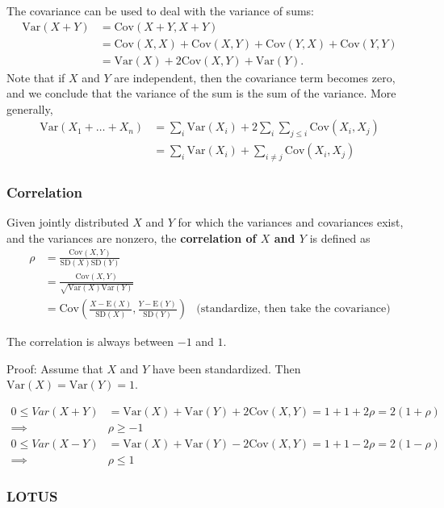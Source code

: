 \documentclass[a4paper,10pt]{article}
\newcommand{\E}{\mathrm{E}}
\newcommand{\Var}{\mathrm{Var}}
\newcommand{\Cov}{\mathrm{Cov}}
\newcommand{\SD}{\mathrm{SD}}
\begin{document}
The covariance can be used to deal with the variance of sums: 
\begin{align*}
    \Var(X+Y) &= \Cov(X+Y, X+Y) \\
    &= \Cov(X, X) + \Cov(X, Y) + \Cov(Y, X) + \Cov(Y, Y) \\
    &= \Var(X) + 2\Cov(X, Y) + \Var(Y).
\end{align*}
Note that if $X$ and $Y$ are independent, then the covariance term becomes zero, and we conclude that the variance of the sum is the sum of the variance. More generally, 
\begin{align*}
    \Var(X_1 + \ldots + X_n) &= \sum_i \Var(X_i) + 2\sum_i \sum_{j \leq i} \Cov(X_i, X_j) \\
    &= \sum_i \Var(X_i) + \sum_{i \neq j} \Cov(X_i, X_j)
\end{align*}

\subsubsection{Correlation}

Given jointly distributed $X$ and $Y$ for which the variances and covariances exist, and the variances are nonzero, the \textbf{correlation of $X$ and $Y$} is defined as 
\begin{align*}
    \rho &= \frac{\Cov(X, Y)}{\SD(X)\SD(Y)} \\
    &= \frac{\Cov(X, Y)}{\sqrt{\Var(X)\Var(Y)}} \\
    &= \Cov\left(\frac{X-\E(X)}{\SD(X)}, \frac{Y-\E(Y)}{\SD(Y)}\right) &\text{(standardize, then take the covariance)}
\end{align*}

The correlation is always between $-1$ and $1$. 

Proof: Assume that $X$ and $Y$ have been standardized. Then $\Var(X) = \Var(Y) = 1$.

\begin{align*}
    0 \leq Var(X+Y) &= \Var(X) + \Var(Y) + 2\Cov(X, Y) = 1 + 1 + 2\rho = 2(1+\rho)\\
    \implies & \rho \geq -1 \\
    0 \leq Var(X-Y) &= \Var(X) + \Var(Y) - 2\Cov(X, Y) = 1 + 1 - 2\rho = 2(1-\rho)\\
    \implies & \rho \leq 1
\end{align*}

\subsubsection{LOTUS}
\end{document}
